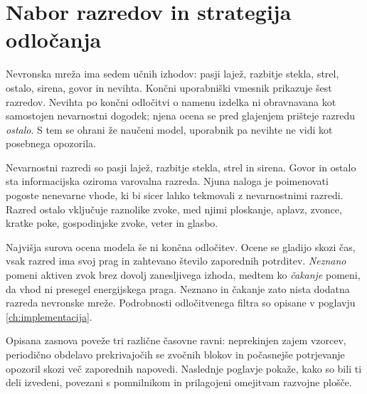 \section{Nabor razredov in strategija odločanja}

Nevronska mreža ima sedem učnih izhodov: pasji lajež, razbitje stekla, strel,
ostalo, sirena, govor in nevihta. Končni uporabniški vmesnik prikazuje
šest razredov. Nevihta po končni odločitvi o namenu izdelka ni obravnavana kot
samostojen nevarnostni dogodek; njena ocena se pred glajenjem prišteje razredu
\emph{ostalo}. S tem se ohrani že naučeni model, uporabnik pa nevihte ne vidi
kot posebnega opozorila.

Nevarnostni razredi so pasji lajež, razbitje stekla, strel in sirena. Govor in
ostalo sta informacijska oziroma varovalna razreda. Njuna naloga je poimenovati
pogoste nenevarne vhode, ki bi sicer lahko tekmovali z nevarnostnimi razredi.
Razred ostalo vključuje raznolike zvoke, med njimi ploskanje, aplavz, zvonce,
kratke poke, gospodinjske zvoke, veter in glasbo.

Najvišja surova ocena modela še ni končna odločitev. Ocene se gladijo skozi
čas, vsak razred ima svoj prag in zahtevano število zaporednih potrditev.
\emph{Neznano} pomeni aktiven zvok brez dovolj zanesljivega izhoda, medtem ko
\emph{čakanje} pomeni, da vhod ni presegel energijskega praga. Neznano in
čakanje zato nista dodatna razreda nevronske mreže. Podrobnosti odločitvenega
filtra so opisane v poglavju \ref{ch:implementacija}.

Opisana zasnova poveže tri različne časovne ravni: neprekinjen zajem vzorcev,
periodično obdelavo prekrivajočih se zvočnih blokov in počasnejše potrjevanje
opozoril skozi več zaporednih napovedi. Naslednje poglavje pokaže, kako so bili
ti deli izvedeni, povezani s pomnilnikom in prilagojeni omejitvam razvojne
plošče.
